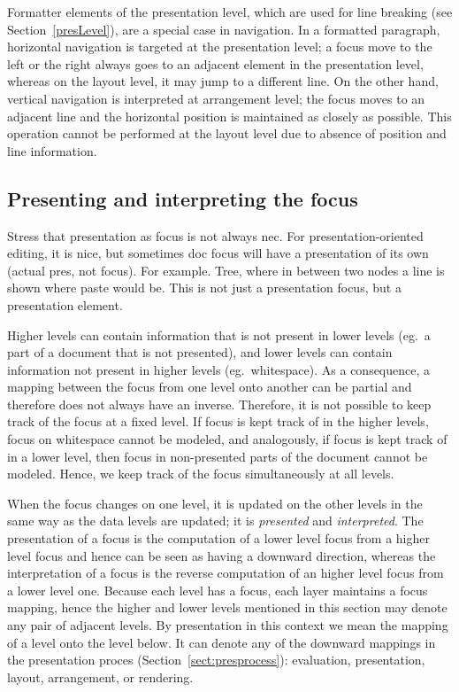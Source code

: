 
Formatter elements of the presentation level, which are used for line breaking (see Section~\ref{presLevel}), are a special case in navigation. In a formatted paragraph, horizontal navigation is targeted at the presentation level; a focus move to the left or the right always goes to an adjacent element in the presentation level, whereas on the layout level, it may jump to a different line. On the other hand, vertical navigation is interpreted at arrangement level; the focus moves to an adjacent line and the horizontal position is maintained as closely as possible. This operation cannot be performed at the layout level due to absence of position and line information. 
 
 
%																
\subsection{Presenting and interpreting the focus}

\bc
Stress that presentation as focus is not always nec. For presentation-oriented editing, it is nice, but sometimes doc
focus will have a presentation of its own (actual pres, not focus). For example. Tree, where in between two nodes a line is shown where paste would be. This is not just a presentation focus, but a presentation element.
\ec 

Higher levels can contain information that is not present in lower levels (eg.\ a part of a document that is not presented), and lower levels can contain information not present in higher levels (eg.\ whitespace). As a consequence, a mapping between the focus from one level onto another can be partial and therefore does not always have an inverse. Therefore, it is not possible to keep track of the focus at a fixed level. If focus is kept track of in the higher levels, focus on whitespace cannot be modeled, and analogously, if focus is kept track of in a lower level, then focus in non-presented parts of the document cannot be modeled. Hence, we keep track of the focus simultaneously at all levels. 

When the focus changes on one level, it is updated on the other levels in the same way as the data levels are updated; it is {\em presented} and {\em interpreted}. The presentation of a focus is the computation of a lower level focus from a higher level focus and hence can be seen as having a downward direction, whereas the interpretation of a focus is the reverse computation of an higher level focus from a lower level one. Because each level has a focus, each layer maintains a focus mapping, hence the higher and lower levels mentioned in this section may denote any pair of adjacent levels. By presentation in this context we mean the mapping of a level onto the level below. It can denote any of the downward mappings in the presentation proces (Section~\ref{sect:presprocess}): evaluation, presentation, layout, arrangement, or rendering.


